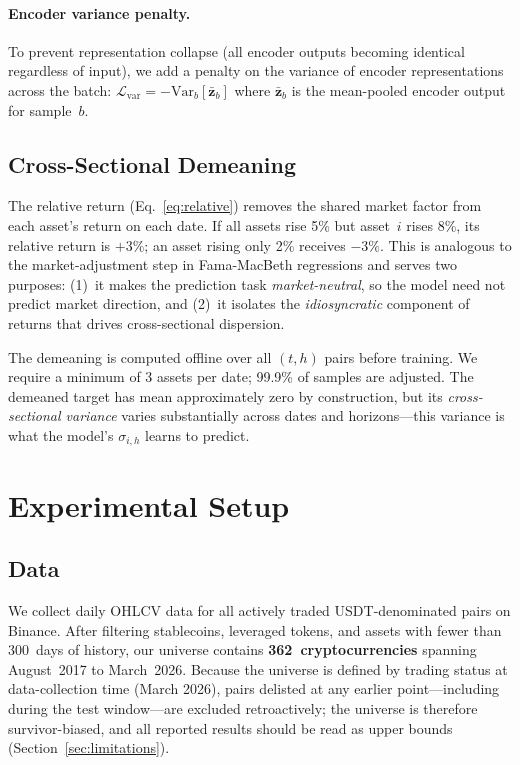 \documentclass[sigconf]{acmart}
\begin{document}
\paragraph{Encoder variance penalty.}
To prevent representation collapse (all encoder outputs becoming identical regardless of input), we add a penalty on the variance of encoder representations across the batch:
$\mathcal{L}_{\text{var}} = -\text{Var}_b\!\left[\bar{\mathbf{z}}_b\right]$
where $\bar{\mathbf{z}}_b$ is the mean-pooled encoder output for sample~$b$.

\subsection{Cross-Sectional Demeaning}

The relative return (Eq.~\ref{eq:relative}) removes the shared market factor from each asset's return on each date.
If all assets rise 5\% but asset~$i$ rises 8\%, its relative return is $+3\%$; an asset rising only 2\% receives $-3\%$.
This is analogous to the market-adjustment step in Fama-MacBeth regressions and serves two purposes: (1)~it makes the prediction task \emph{market-neutral}, so the model need not predict market direction, and (2)~it isolates the \emph{idiosyncratic} component of returns that drives cross-sectional dispersion.

The demeaning is computed offline over all $(t, h)$ pairs before training.
We require a minimum of 3 assets per date; 99.9\% of samples are adjusted.
The demeaned target has mean approximately zero by construction, but its \emph{cross-sectional variance} varies substantially across dates and horizons---this variance is what the model's $\sigma_{i,h}$ learns to predict.


\section{Experimental Setup}

\subsection{Data}

We collect daily OHLCV data for all actively traded USDT-denominated pairs on Binance.
After filtering stablecoins, leveraged tokens, and assets with fewer than 300~days of history, our universe contains \textbf{362~crypto\-currencies} spanning August~2017 to March~2026.
Because the universe is defined by trading status at data-collection time (March 2026), pairs delisted at any earlier point---including during the test window---are excluded retroactively; the universe is therefore survivor-biased, and all reported results should be read as upper bounds (Section~\ref{sec:limitations}).
\end{document}
